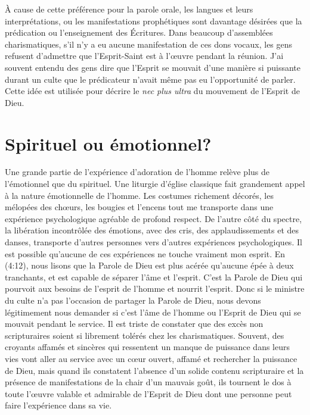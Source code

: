 À cause de cette préférence pour la parole orale, les langues
 et leurs interprétations, ou les manifestations prophétiques
 sont davantage désirées que la prédication ou l'enseignement des Écritures.
 Dans beaucoup d'assemblées charismatiques, s'il n'y a eu aucune
 manifestation de ces dons vocaux, les gens refusent d'admettre que
 l'Esprit-Saint est à l'œuvre pendant la réunion.
 J'ai souvent entendu des gens dire que l'Esprit se mouvait d'une manière
 si puissante durant un culte que le prédicateur n'avait même pas eu
 l'opportunité de parler. Cette idée est utilisée pour décrire le
 \emph{nec plus ultra} du mouvement de l'Esprit de Dieu.


\section{Spirituel ou \'emotionnel?}

Une grande partie de l'expérience d'adoration de l'homme relève plus
 de l'émotionnel que du spirituel.
 Une liturgie d'église classique fait grandement appel à la nature émotionnelle de l'homme.
 Les costumes richement décorés, les mélopées des chœurs, les bougies et l'encens
 \ocadr tout me transporte dans une expérience psychologique agréable
 de profond respect. De l'autre côté du spectre, la libération incontrôlée
 des émotions, avec des cris, des applaudissements et des danses,
 transporte d'autres personnes vers d'autres expériences psychologiques.
 Il est possible qu'aucune de ces expériences ne touche vraiment mon esprit.
 En (4:12), nous lisons que la Parole de Dieu
 est plus acérée qu'aucune épée à deux tranchants,
 et est capable de séparer l'âme et l'esprit.
 C'est la Parole de Dieu qui pourvoit aux besoins de l'esprit de l'homme
 et nourrit l'esprit. Donc si le ministre du culte n'a pas l'occasion
 de partager la Parole de Dieu, nous devons légitimement nous demander
 si c'est l'âme de l'homme ou l'Esprit de Dieu qui se mouvait pendant
 le service. Il est triste de constater que des excès non scripturaires soient si
 librement tolérés chez les charismatiques.
 Souvent, des croyants affamés et sincères qui ressentent un manque
 de puissance dans leurs vies vont aller au service avec un cœur ouvert,
 affamé et rechercher la puissance de Dieu, mais quand ils constatent
 l'absence d'un solide contenu scripturaire et la présence
 de manifestations de la chair d'un mauvais goût, ils tournent le dos
 à toute l'œuvre valable et admirable de l'Esprit de Dieu dont une personne
 peut faire l'expérience dans sa vie.


